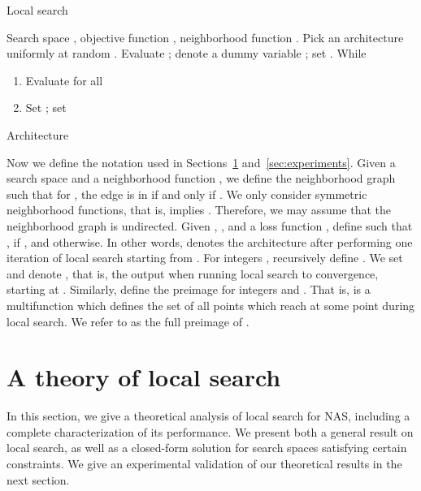 \documentclass[11pt]{article}
\numberwithin{equation}{section}
\numberwithin{figure}{section}
\theoremstyle{plain}
\theoremstyle{definition}
\begin{document}
\begin{algorithm}
\caption{Local search}\label{alg:local_search}
\begin{algorithmic}  Search space , objective function , 
neighborhood function 
. Pick an architecture  uniformly at random
. Evaluate ; denote a dummy variable ; set 
. While 
\begin{enumerate}[label=\roman*., itemsep=1pt, parsep=1mm, topsep=1pt, leftmargin=8mm]
    \item Evaluate  for all 
    \item Set ; set 
\end{enumerate}
 Architecture 
\end{algorithmic}
\end{algorithm}

Now we define the notation used in Sections~\ref{sec:method} and~\ref{sec:experiments}.
Given a search space  and a neighborhood function ,
we define the neighborhood graph  such that for , 
the edge  is in  if and only if .
We only consider symmetric neighborhood functions, that is,  implies . 
Therefore, we may assume that the neighborhood graph is undirected.
Given , , and a loss function , define  such
that ,  if 
, and  otherwise.
In other words,  denotes the architecture after performing one iteration 
of local search starting from . 
For integers , recursively define .
We set  and denote ,
that is, the output when running local search to convergence, starting at .
Similarly, define the preimage  for integers 
and .
That is,  is a multifunction which defines the set of all points  
which reach  at some point during local search.
We refer to  as the full preimage of .
 
\section{A theory of local search} \label{sec:method}


In this section, we give a theoretical analysis of local search for NAS,
including a complete characterization of its performance.
We present both a general result on local search, as well as a closed-form solution for search spaces satisfying certain constraints.
We give an experimental validation of our theoretical results in the next section.
\end{document}
